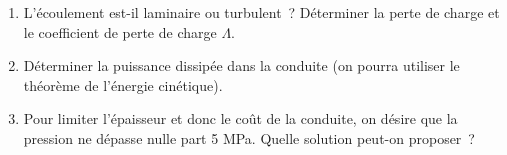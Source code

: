 \begin{enumerate}
\item 
  L'\'ecoulement est-il laminaire ou turbulent~? 
  D\'eterminer la perte de charge et le coefficient de perte de charge $\Lambda$.
\item 
  D\'eterminer la puissance dissip\'ee dans la conduite 
  (on pourra utiliser le th\'eor\`eme de l'\'energie cin\'etique).
\item 
  Pour limiter l'\'epaisseur et donc le coût de la conduite, on d\'esire que la pression 
  ne d\'epasse nulle part 5 MPa. Quelle solution peut-on proposer~?
\end{enumerate}



